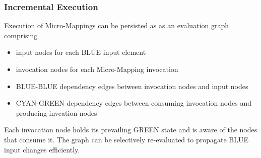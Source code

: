 \documentclass[conference]{IEEEtran}
\begin{document}

\subsubsection{Incremental Execution}

Execution of Micro-Mappings can be persisted as as an evaluation graph comprising
\begin{itemize}
\item input nodes for each BLUE input element
\item invocation nodes for each Micro-Mapping invocation
\item BLUE-BLUE dependency edges between invocation nodes and input nodes
\item CYAN-GREEN dependency edges between consuming invocation nodes and producing invcation nodes
\end{itemize}
Each invocation node holds its prevailing GREEN state and is aware of the nodes that consume it.
The graph can be selectively re-evaluated to propagate BLUE input changes efficiently. 


\end{document}
